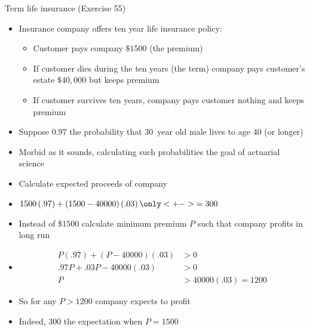 \documentclass[handout]{beamer}
\theoremstyle{definition}
\begin{document}
\begin{frame}{Term life insurance (Exercise 55)}
\begin{itemize}
\item Insurance company offers \alert{ten year life
insurance policy}:
\begin{itemize}
\item Customer pays company $\$1500$ (the \alert{premium})
\item If customer dies during the ten years
(the \alert{term}) company pays customer's estate
$\$40,000$ but keeps premium
\item If customer survives ten years, company pays customer
nothing and keeps premium
\end{itemize}
\item Suppose $0.97$ the
probability that 30~year old male lives to age $40$ (or longer)
\item Morbid as it sounds, calculating such probabilities
the goal of \alert{actuarial science}
\item Calculate expected proceeds of company
\end{itemize}
\end{frame}

\begin{frame}
\begin{itemize}
\item $1500\left(.97\right)+\left(1500-40000\right)\left(.03\right)
\only<+->{=300}$
\item Instead of $\$1500$ calculate \alert{minimum}
premium $P$ such that company profits in long run
\item[]
\begin{align*}
P\left(.97\right)+\left(P-40000\right)\left(.03\right)&>0\\
.97P+.03P-40000\left(.03\right)&>0\\
P&>40000\left(.03\right)=1200
\end{align*}
\item So for any $P>1200$ company expects to profit
\item Indeed, $300$ the expectation when $P=1500$
\end{itemize}
\end{frame}
\end{document}
